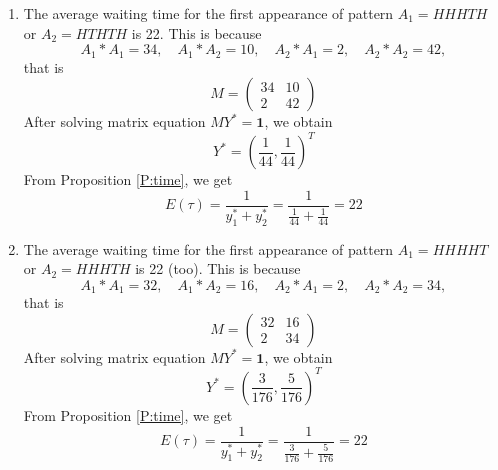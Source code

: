 \begin{example}
  \begin{enumerate}

    \item The average waiting time for the first appearance of pattern
    $A_1=HHHTH$ or $A_2=HTHTH$ is 22. This is because 
    \[
      A_1 \ast A_1 = 34, \quad   A_1 \ast A_2 = 10,
      \quad  A_2 \ast A_1 = 2, \quad   A_2 \ast A_2 = 42,
    \]
    that is
    \[
      M=
      \begin{pmatrix}
        34  &10 \\
        2   &42 
      \end{pmatrix}
    \]
    After solving matrix equation $MY^*=\mathbf{1}$, we obtain
    \[
      Y^* = \left( \frac{1}{44}, \frac{1}{44} \right) ^T
    \]
    From Proposition \ref{P:time}, we get
    \[
      E(\tau) = \frac{1}{y_1^*+y_2^*}=\frac{1}{\frac{1}{44}+\frac{1}{44}}
      =22
    \]

    \item The average waiting time for the first appearance of pattern
    $A_1=HHHHT$ or $A_2=HHHTH$ is 22 (too). This is because 
    \[
      A_1 \ast A_1 = 32, \quad   A_1 \ast A_2 = 16,
      \quad  A_2 \ast A_1 = 2, \quad   A_2 \ast A_2 = 34,
    \]
    that is
    \[
      M=
      \begin{pmatrix}
        32  &16 \\
        2   &34 
      \end{pmatrix}
    \]
    After solving matrix equation $MY^*=\mathbf{1}$, we obtain
    \[
      Y^* = \left( \frac{3}{176}, \frac{5}{176} \right) ^T
    \]
    From Proposition \ref{P:time}, we get
    \[
      E(\tau) = \frac{1}{y_1^*+y_2^*} 
        = \frac{ 1 }{ \frac{3}{176} + \frac{5}{176} }  = 22
    \]

  \end{enumerate}
\end{example}



